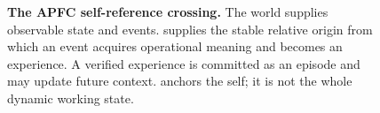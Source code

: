 \begin{figure}[!t]
\centering
\resizebox{0.92\textwidth}{!}{}
\caption{\textbf{The APFC self-reference crossing.}
The world supplies observable state and events.   supplies the
stable relative origin from which an event acquires operational meaning and
becomes an experience.  A verified experience is committed as an episode and
may update future context.   anchors the self; it is not the whole
dynamic working state.}
\label{fig:self-experience-cross}
\end{figure}
